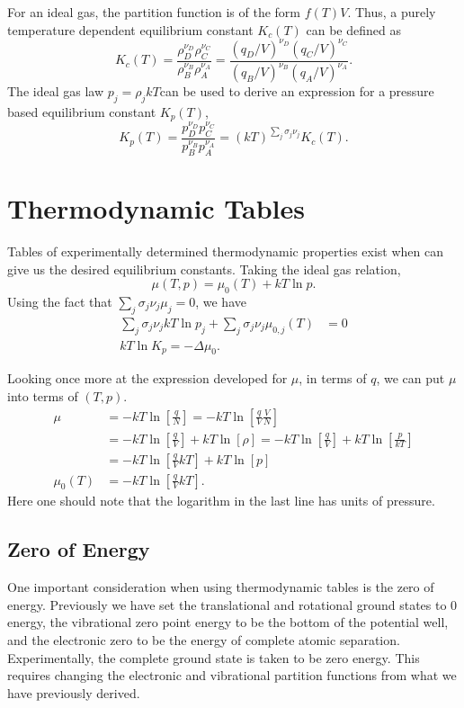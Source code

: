 For an ideal gas, the partition function is of the form $f(T) V$. Thus, a purely
temperature dependent equilibrium constant $K_c (T)$ can be defined as
\begin{equation*}
	K_c (T) = \frac{\rho_{D}^{\nu_D}\rho_{C}^{\nu_C}}
	{\rho_{B}^{\nu_B}\rho_{A}^{\nu_A}} =
	\frac{{(q_{D}/V)}^{\nu_D}{(q_{C}/V)}^{\nu_C}}
	{{(q_{B}/V)}^{\nu_B}{(q_{A}/V)}^{\nu_A}}.
\end{equation*}
The ideal gas law $p_j = \rho_j kT$can be used to derive an expression for a pressure based
equilibrium constant $K_p (T)$,
\begin{equation*}
	K_p(T) = \frac{p_{D}^{\nu_D}p_{C}^{\nu_C}}{p_{B}^{\nu_B}p_{A}^{\nu_A}} =
	(kT)^{\sum_{j}{\sigma_j \nu_{j}}} K_c (T).
\end{equation*}

\section{Thermodynamic Tables}%
\label{sec:chemeqtt}
Tables of experimentally determined thermodynamic properties exist when can give
us the desired equilibrium constants. Taking the ideal gas relation,
\begin{equation*}
	\mu(T,p) = \mu_0 (T) + kT\ln{p}.
\end{equation*}
Using the fact that $\sum_{j}{\sigma_j \nu_j \mu_j} = 0$, we have
\begin{align*}
	\sum_{j}{\sigma_j \nu_j kT\ln{p_{j}}} + \sum_{j}{\sigma_j \nu_j
	\mu_{0,j}(T)} &= 0\\
	kT\ln{K_{p}} = - {\Delta \mu_{0}}.
\end{align*}

Looking once more at the expression developed for $\mu$, in terms of $q$, we can
put $\mu$ into terms of $(T, p)$.
\begin{align*}
	\mu &= -kT\ln{\left[\frac{q}{N}\right]} = 
	-kT\ln{\left[\frac{q}{V} \frac{V}{N}\right]}\\
		&= -kT\ln{\left[\frac{q}{V} \right]} + kT\ln{[\rho]} =
		-kT\ln{\left[\frac{q}{V} \right]} + kT\ln{\left[ \frac{p}{kT} \right]} \\
		&= -kT\ln{\left[\frac{q}{V} kT \right]} + kT\ln{[p]} \\
	\mu_0 (T) &= -kT\ln{\left[\frac{q}{V} kT \right]}.
\end{align*}
Here one should note that the logarithm in the last line has units of pressure.
\subsection{Zero of Energy}
One important consideration when using thermodynamic tables is the zero of
energy. Previously we have set the translational and rotational ground states to
0 energy, the vibrational zero point energy to be the bottom of the potential
well, and the electronic zero to be the energy of complete atomic separation.
Experimentally, the complete ground state is taken to be zero energy. This
requires changing the electronic and vibrational partition functions from what
we have previously derived.

